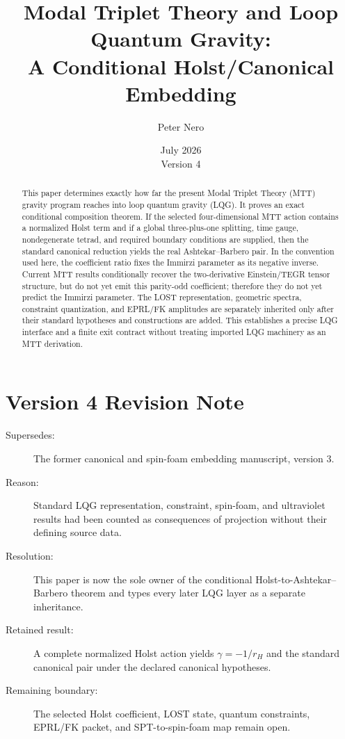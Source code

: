 \documentclass[11pt]{article}
\title{Modal Triplet Theory and Loop Quantum Gravity:\\
\large A Conditional Holst/Canonical Embedding}
\author{Peter Nero}
\date{July 2026\\Version 4}
\theoremstyle{plain}
\begin{document}
\maketitle

\begin{abstract}
This paper determines exactly how far the present Modal Triplet Theory (MTT)
gravity program reaches into loop quantum gravity (LQG). It proves an exact
conditional composition theorem. If the selected four-dimensional MTT
action contains a normalized Holst term and if a global three-plus-one splitting,
time gauge, nondegenerate tetrad, and required boundary conditions are
supplied, then the standard canonical reduction yields the real
Ashtekar--Barbero pair. In the convention used here, the coefficient ratio
fixes the Immirzi parameter as its negative inverse. Current MTT results
conditionally recover the two-derivative Einstein/TEGR tensor structure, but
do not yet emit this parity-odd coefficient; therefore they do not yet
predict the Immirzi parameter. The LOST representation, geometric spectra, constraint
quantization, and EPRL/FK amplitudes are separately inherited only after
their standard hypotheses and constructions are added. This establishes a
precise LQG interface and a finite exit contract without treating imported
LQG machinery as an MTT derivation.
\end{abstract}

\section*{Version 4 Revision Note}
\begin{description}
\item[Supersedes:] The former canonical and spin-foam embedding manuscript,
version 3.
\item[Reason:] Standard LQG representation, constraint, spin-foam, and
ultraviolet results had been counted as consequences of projection without
their defining source data.
\item[Resolution:] This paper is now the sole owner of the conditional
Holst-to-Ashtekar--Barbero theorem and types every later LQG layer as a
separate inheritance.
\item[Retained result:] A complete normalized Holst action yields
\(\gamma=-1/r_H\) and the standard canonical pair under the declared
canonical hypotheses.
\item[Remaining boundary:] The selected Holst coefficient, LOST state,
quantum constraints, EPRL/FK packet, and SPT-to-spin-foam map remain open.
\end{description}
\end{document}
